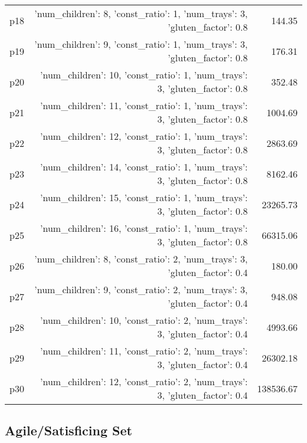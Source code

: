 \documentclass{article}
\begin{document}
\begin{center}
\begin{tabular}{@{}l|r|r@{}}
  p18&{'num\_children': 8, 'const\_ratio': 1, 'num\_trays': 3, 'gluten\_factor': 0.8}&144.35\\
  p19&{'num\_children': 9, 'const\_ratio': 1, 'num\_trays': 3, 'gluten\_factor': 0.8}&176.31\\
  p20&{'num\_children': 10, 'const\_ratio': 1, 'num\_trays': 3, 'gluten\_factor': 0.8}&352.48\\
  p21&{'num\_children': 11, 'const\_ratio': 1, 'num\_trays': 3, 'gluten\_factor': 0.8}&1004.69\\
  p22&{'num\_children': 12, 'const\_ratio': 1, 'num\_trays': 3, 'gluten\_factor': 0.8}&2863.69\\
  p23&{'num\_children': 14, 'const\_ratio': 1, 'num\_trays': 3, 'gluten\_factor': 0.8}&8162.46\\
  p24&{'num\_children': 15, 'const\_ratio': 1, 'num\_trays': 3, 'gluten\_factor': 0.8}&23265.73\\
  p25&{'num\_children': 16, 'const\_ratio': 1, 'num\_trays': 3, 'gluten\_factor': 0.8}&66315.06\\
  p26&{'num\_children': 8, 'const\_ratio': 2, 'num\_trays': 3, 'gluten\_factor': 0.4}&180.00\\
  p27&{'num\_children': 9, 'const\_ratio': 2, 'num\_trays': 3, 'gluten\_factor': 0.4}&948.08\\
  p28&{'num\_children': 10, 'const\_ratio': 2, 'num\_trays': 3, 'gluten\_factor': 0.4}&4993.66\\
  p29&{'num\_children': 11, 'const\_ratio': 2, 'num\_trays': 3, 'gluten\_factor': 0.4}&26302.18\\
  p30&{'num\_children': 12, 'const\_ratio': 2, 'num\_trays': 3, 'gluten\_factor': 0.4}&138536.67
                            \end{tabular}
                            \end{center}
                    

                                \subsection*{Agile/Satisficing Set}
                                
\end{document}
